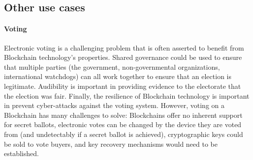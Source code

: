 


\subsection{Other use cases}

\paragraph{Voting}
Electronic voting is a challenging problem that is often asserted to benefit from Blockchain technology's properties.
Shared governance could be used to ensure that multiple parties (the government, non-governmental organizations, international watchdogs) can all work together to ensure that an election is legitimate.
Audibility is important in providing evidence to the electorate that the election was fair.
Finally, the resilience of Blockchain technology is important in prevent cyber-attacks against the voting system.
However, voting on a Blockchain has many challenges to solve: Blockchains offer no inherent support for secret ballots, electronic votes can be changed by the device they are voted from (and undetectably if a secret ballot is achieved), cryptographic keys could be sold to vote buyers, and key recovery mechanisms would need to be established. 


